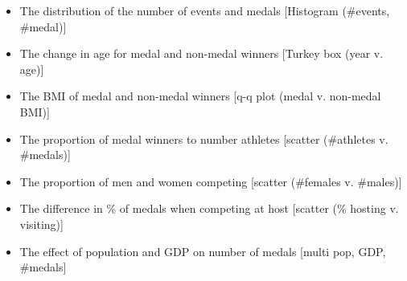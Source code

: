 \documentclass[a4 paper, 12pt]{article}
\begin{document}
    \begin{itemize}
        \item The distribution of the number of events and medals [Histogram (\#events, \#medal)]
        


        
        \item The change in age for medal and non-medal winners [Turkey box (year v. age)]
        \item The BMI of medal and non-medal winners [q-q plot (medal v. non-medal BMI)]
        \item The proportion of medal winners to number athletes [scatter (\#athletes v. \#medals)]
        \item The proportion of men and women competing [scatter (\#females v. \#males)]
        \item The difference in \% of medals when competing at host [scatter (\% hosting v. visiting)]
        \item The effect of population and GDP on number of medals [multi \- pop, GDP, \#medals]
    \end{itemize}




\pagebreak
\appendix
\addappheadtotoc
\appendixpage
\end{document}
